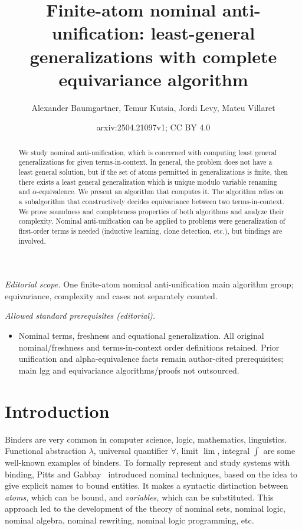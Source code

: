 \documentclass[11pt,a4paper]{amsart}
\title{Finite-atom nominal anti-unification: least-general generalizations with complete equivariance algorithm}
\author{Alexander Baumgartner, Temur Kutsia, Jordi Levy, Mateu Villaret}
\date{arxiv:2504.21097v1; CC BY 4.0}
\theoremstyle{definition}
\begin{document}
\maketitle
\noindent\textit{Editorial scope.} One finite-atom nominal anti-unification main algorithm group; equivariance, complexity and cases not separately counted.\par\medskip
\noindent\textit{Allowed standard prerequisites (editorial).}\begin{itemize}
\item Nominal terms, freshness and equational generalization. All original nominal/freshness and terms-in-context order definitions retained. Prior unification and alpha-equivalence facts remain author-cited prerequisites; main lgg and equivariance algorithms/proofs not outsourced.
\end{itemize}\medskip
\begin{abstract}
We study nominal anti-unification, which is concerned with computing
least general generalizations for given terms-in-context. In general,
the problem does not have a least general solution, but if the set of
atoms permitted in generalizations is finite, then there exists a
least general generalization which is unique modulo variable renaming
and $\alpha$-equivalence. We present an algorithm that computes
it. The algorithm relies on a subalgorithm that constructively decides
equivariance between two terms-in-context. We prove soundness and
completeness properties of both algorithms and analyze their
complexity.  Nominal anti-unification can be applied to problems were
generalization of first-order terms is needed (inductive learning,
clone detection, etc.), but bindings are involved.
\end{abstract}

\section{Introduction}

Binders are very common in computer science, logic, mathematics,
linguistics. Functional abstraction $\lambda$, universal quantifier
$\forall$, limit $\lim$, integral $\int$ are some well-known examples
of binders. To formally represent and study systems with binding,
Pitts and
Gabbay~\cite{DBLP:conf/lics/GabbayP99,DBLP:journals/fac/GabbayP02,GabbayThesis}
introduced nominal techniques, based on the idea to give explicit
names to bound entities. It makes a syntactic distinction between
\emph{atoms,} which can be bound, and \emph{variables,} which can be
substituted. This approach led to the development of the theory of
nominal sets, nominal logic, nominal algebra, nominal rewriting,
nominal logic programming, etc.
\end{document}
